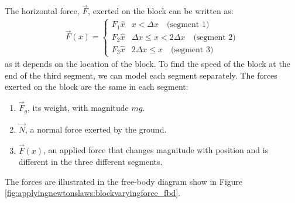 The horizontal force, $\vec F$, exerted on the block can be written as:
\begin{align*}
  \vec F (x)=
  \begin{cases}
    F_1\hat x & x<\Delta x \quad \text{(segment 1)}\\
    F_2\hat x & \Delta x \leq x< 2\Delta x \quad \text{(segment 2)}\\
    F_3\hat x & 2\Delta x \leq x\quad \text{(segment 3)}
  \end{cases}
\end{align*}
as it depends on the location of the block. To find the speed of the block at the end of the third segment, we can model each segment separately. The forces exerted on the block are the same in each segment:
\begin{enumerate}
\item $\vec F_g$, its weight, with magnitude $mg$.
\item $\vec N$, a normal force exerted by the ground.
\item $\vec F(x)$, an applied force that changes magnitude with position and is different in the three different segments.
\end{enumerate}
The forces are illustrated in the free-body diagram show in Figure \ref{fig:applyingnewtonslaws:blockvaryingforce_fbd}.


